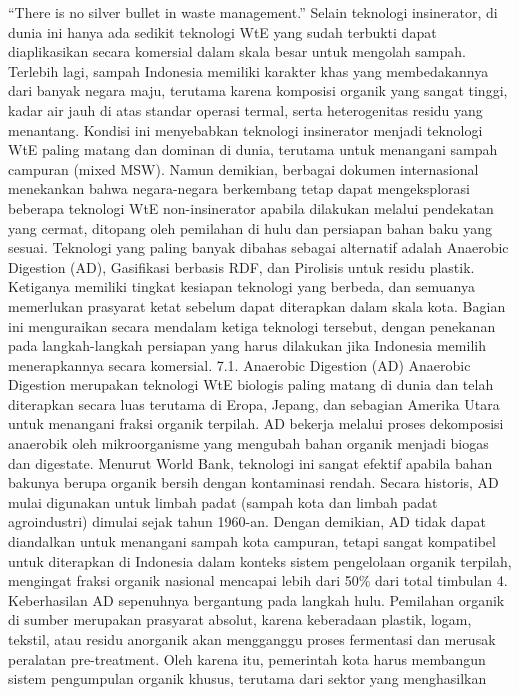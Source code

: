 \documentclass[
  letterpaper,
  DIV=11,
  numbers=noendperiod]{scrreprt}
\begin{document}
``There is no silver bullet in waste management.'' Selain teknologi
insinerator, di dunia ini hanya ada sedikit teknologi WtE yang sudah
terbukti dapat diaplikasikan secara komersial dalam skala besar untuk
mengolah sampah. Terlebih lagi, sampah Indonesia memiliki karakter khas
yang membedakannya dari banyak negara maju, terutama karena komposisi
organik yang sangat tinggi, kadar air jauh di atas standar operasi
termal, serta heterogenitas residu yang menantang. Kondisi ini
menyebabkan teknologi insinerator menjadi teknologi WtE paling matang
dan dominan di dunia, terutama untuk menangani sampah campuran (mixed
MSW). Namun demikian, berbagai dokumen internasional menekankan bahwa
negara-negara berkembang tetap dapat mengeksplorasi beberapa teknologi
WtE non-insinerator apabila dilakukan melalui pendekatan yang cermat,
ditopang oleh pemilahan di hulu dan persiapan bahan baku yang sesuai.
Teknologi yang paling banyak dibahas sebagai alternatif adalah Anaerobic
Digestion (AD), Gasifikasi berbasis RDF, dan Pirolisis untuk residu
plastik. Ketiganya memiliki tingkat kesiapan teknologi yang berbeda, dan
semuanya memerlukan prasyarat ketat sebelum dapat diterapkan dalam skala
kota. Bagian ini menguraikan secara mendalam ketiga teknologi tersebut,
dengan penekanan pada langkah-langkah persiapan yang harus dilakukan
jika Indonesia memilih menerapkannya secara komersial. 7.1. Anaerobic
Digestion (AD) Anaerobic Digestion merupakan teknologi WtE biologis
paling matang di dunia dan telah diterapkan secara luas terutama di
Eropa, Jepang, dan sebagian Amerika Utara untuk menangani fraksi organik
terpilah. AD bekerja melalui proses dekomposisi anaerobik oleh
mikroorganisme yang mengubah bahan organik menjadi biogas dan digestate.
Menurut World Bank, teknologi ini sangat efektif apabila bahan bakunya
berupa organik bersih dengan kontaminasi rendah. Secara historis, AD
mulai digunakan untuk limbah padat (sampah kota dan limbah padat
agroindustri) dimulai sejak tahun 1960-an. Dengan demikian, AD tidak
dapat diandalkan untuk menangani sampah kota campuran, tetapi sangat
kompatibel untuk diterapkan di Indonesia dalam konteks sistem
pengelolaan organik terpilah, mengingat fraksi organik nasional mencapai
lebih dari 50\% dari total timbulan 4. Keberhasilan AD sepenuhnya
bergantung pada langkah hulu. Pemilahan organik di sumber merupakan
prasyarat absolut, karena keberadaan plastik, logam, tekstil, atau
residu anorganik akan mengganggu proses fermentasi dan merusak peralatan
pre-treatment. Oleh karena itu, pemerintah kota harus membangun sistem
pengumpulan organik khusus, terutama dari sektor yang menghasilkan
\end{document}
